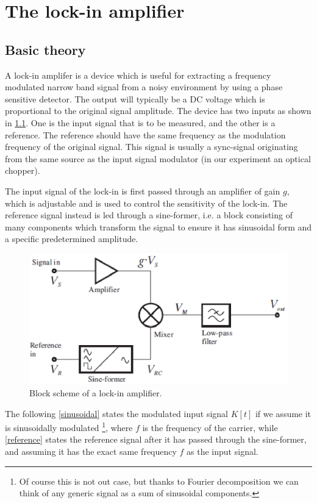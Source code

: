 \chapter{The lock-in amplifier}
	\section{Basic theory}



A lock-in amplifer is a device which is useful for extracting a frequency modulated narrow band signal from a noisy environment by using a phase sensitive detector. The output will typically be a DC voltage which is proportional to the original signal amplitude. The device has two inputs as shown in \cref{lockin1}. One is the input signal that is to be measured, and the other is a reference. The reference should have the same frequency as the modulation frequency of the original signal. This signal is usually a sync-signal originating from the same source as the input signal modulator (in our experiment an optical chopper). 

The input signal of the lock-in is first passed through an amplifier of gain $g$, which is adjustable and is used to control the sensitivity of the lock-in. The reference signal instead is led through a sine-former, i.e.  a block consisting of many components which transform the signal to ensure it has sinusoidal form and a specific predetermined amplitude.

\begin{figure}[!hbt]\centering
\includegraphics[width=\linewidth, draft=\foto]{eps/lockin1.eps}
\caption{Block scheme of a lock-in amplifier.}
\label{lockin1}
\end{figure}

The following \cref{sinusoidal} states the  modulated input signal $K[t]$ if we assume it is sinusoidally modulated \footnote{Of course this is not out case, but thanks to Fourier decomposition we can think of any generic signal as a sum of sinusoidal components.}, where $f$ is the frequency of the carrier, while \cref{reference} states the reference signal after it has passed through the sine-former, and assuming it has the exact same frequency $f$ as the input signal.

